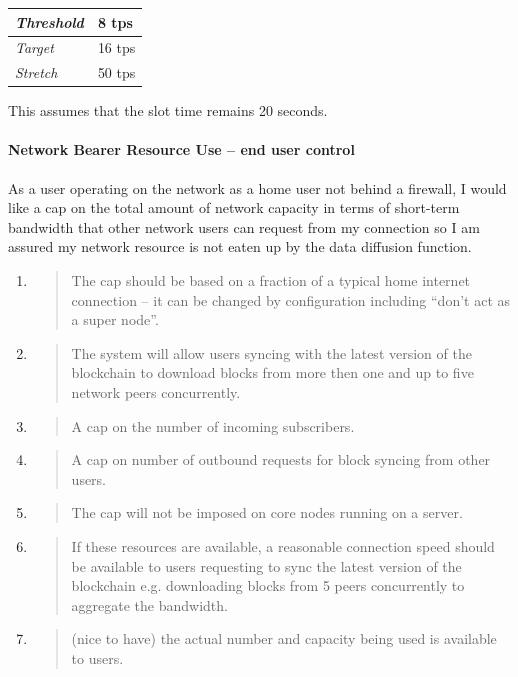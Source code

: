 \documentclass[11pt,a4paper]{article}
\begin{document}
\begin{longtable}[]{@{}ll@{}}
\toprule
\emph{Threshold} & 8 tps\tabularnewline
\midrule
\endhead
\emph{Target} & 16 tps\tabularnewline
\emph{Stretch} & 50 tps\tabularnewline
\bottomrule
\end{longtable}

This assumes that the slot time remains 20 seconds.

\paragraph{Network Bearer Resource Use -- end user control}

As a user operating on the network as a home user not behind a firewall,
I would like a cap on the total amount of network capacity in terms of
short-term bandwidth that other network users can request from my
connection so I am assured my network resource is not eaten up by the
data diffusion function.

\begin{enumerate}
\def\labelenumi{\arabic{enumi}.}
\item
  \begin{quote}
  The cap should be based on a fraction of a typical home internet
  connection -- it can be changed by configuration including ``don't act
  as a super node''.
  \end{quote}
\item
  \begin{quote}
  The system will allow users syncing with the latest version of the
  blockchain to download blocks from more then one and up to five
  network peers concurrently.
  \end{quote}
\item
  \begin{quote}
  A cap on the number of incoming subscribers.
  \end{quote}
\item
  \begin{quote}
  A cap on number of outbound requests for block syncing from other
  users.
  \end{quote}
\item
  \begin{quote}
  The cap will not be imposed on core nodes running on a server.
  \end{quote}
\item
  \begin{quote}
  If these resources are available, a reasonable connection speed should
  be available to users requesting to sync the latest version of the
  blockchain e.g. downloading blocks from 5 peers concurrently to
  aggregate the bandwidth.
  \end{quote}
\item
  \begin{quote}
  (nice to have) the actual number and capacity being used is available
  to users.
  \end{quote}
\end{enumerate}
\end{document}
